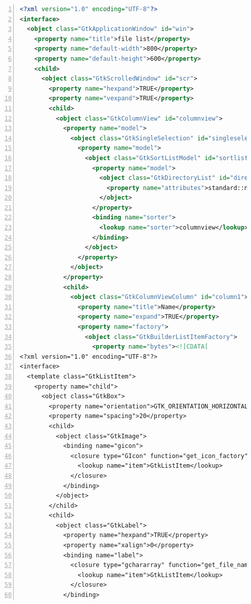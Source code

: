 \begin{lstlisting}[language=XML, numbers=left]
<?xml version="1.0" encoding="UTF-8"?>
<interface>
  <object class="GtkApplicationWindow" id="win">
    <property name="title">file list</property>
    <property name="default-width">800</property>
    <property name="default-height">600</property>
    <child>
      <object class="GtkScrolledWindow" id="scr">
        <property name="hexpand">TRUE</property>
        <property name="vexpand">TRUE</property>
        <child>
          <object class="GtkColumnView" id="columnview">
            <property name="model">
              <object class="GtkSingleSelection" id="singleselection">
                <property name="model">
                  <object class="GtkSortListModel" id="sortlist">
                    <property name="model">
                      <object class="GtkDirectoryList" id="directorylist">
                        <property name="attributes">standard::name,standard::icon,standard::size,time::modified</property>
                      </object>
                    </property>
                    <binding name="sorter">
                      <lookup name="sorter">columnview</lookup>
                    </binding>
                  </object>
                </property>
              </object>
            </property>
            <child>
              <object class="GtkColumnViewColumn" id="column1">
                <property name="title">Name</property>
                <property name="expand">TRUE</property>
                <property name="factory">
                  <object class="GtkBuilderListItemFactory">
                    <property name="bytes"><![CDATA[
<?xml version="1.0" encoding="UTF-8"?>
<interface>
  <template class="GtkListItem">
    <property name="child">
      <object class="GtkBox">
        <property name="orientation">GTK_ORIENTATION_HORIZONTAL</property>
        <property name="spacing">20</property>
        <child>
          <object class="GtkImage">
            <binding name="gicon">
              <closure type="GIcon" function="get_icon_factory">
                <lookup name="item">GtkListItem</lookup>
              </closure>
            </binding>
          </object>
        </child>
        <child>
          <object class="GtkLabel">
            <property name="hexpand">TRUE</property>
            <property name="xalign">0</property>
            <binding name="label">
              <closure type="gchararray" function="get_file_name_factory">
                <lookup name="item">GtkListItem</lookup>
              </closure>
            </binding>

\end{lstlisting}
